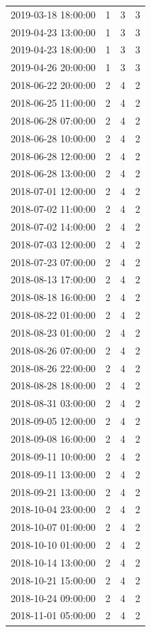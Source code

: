 \begin{tabular}{lrrr}
2019-03-18 18:00:00 & 1 & 3 & 3 \\
2019-04-23 13:00:00 & 1 & 3 & 3 \\
2019-04-23 18:00:00 & 1 & 3 & 3 \\
2019-04-26 20:00:00 & 1 & 3 & 3 \\
2018-06-22 20:00:00 & 2 & 4 & 2 \\
2018-06-25 11:00:00 & 2 & 4 & 2 \\
2018-06-28 07:00:00 & 2 & 4 & 2 \\
2018-06-28 10:00:00 & 2 & 4 & 2 \\
2018-06-28 12:00:00 & 2 & 4 & 2 \\
2018-06-28 13:00:00 & 2 & 4 & 2 \\
2018-07-01 12:00:00 & 2 & 4 & 2 \\
2018-07-02 11:00:00 & 2 & 4 & 2 \\
2018-07-02 14:00:00 & 2 & 4 & 2 \\
2018-07-03 12:00:00 & 2 & 4 & 2 \\
2018-07-23 07:00:00 & 2 & 4 & 2 \\
2018-08-13 17:00:00 & 2 & 4 & 2 \\
2018-08-18 16:00:00 & 2 & 4 & 2 \\
2018-08-22 01:00:00 & 2 & 4 & 2 \\
2018-08-23 01:00:00 & 2 & 4 & 2 \\
2018-08-26 07:00:00 & 2 & 4 & 2 \\
2018-08-26 22:00:00 & 2 & 4 & 2 \\
2018-08-28 18:00:00 & 2 & 4 & 2 \\
2018-08-31 03:00:00 & 2 & 4 & 2 \\
2018-09-05 12:00:00 & 2 & 4 & 2 \\
2018-09-08 16:00:00 & 2 & 4 & 2 \\
2018-09-11 10:00:00 & 2 & 4 & 2 \\
2018-09-11 13:00:00 & 2 & 4 & 2 \\
2018-09-21 13:00:00 & 2 & 4 & 2 \\
2018-10-04 23:00:00 & 2 & 4 & 2 \\
2018-10-07 01:00:00 & 2 & 4 & 2 \\
2018-10-10 01:00:00 & 2 & 4 & 2 \\
2018-10-14 13:00:00 & 2 & 4 & 2 \\
2018-10-21 15:00:00 & 2 & 4 & 2 \\
2018-10-24 09:00:00 & 2 & 4 & 2 \\
2018-11-01 05:00:00 & 2 & 4 & 2 \\

\end{tabular}
